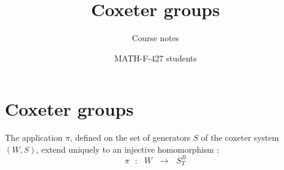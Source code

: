 \documentclass[envcountsame,envcountchap]{svmono}
\newcommand{\qq}{\text{ }}
\newcommand{\fctt}[2]{\qq:\qq#1\qq\rightarrow\qq#2}
\begin{document}
\author{MATH-F-427 students}
\title{Coxeter groups}
\subtitle{Course notes}
\maketitle

\frontmatter%

\tableofcontents


\mainmatter%
\part{Coxeter groups}



	\begin{theorem}\label{Theorem de l'extension en un morphisme injectif de groupe.}
		The application $\pi$, defined on the set of generators $S$ of the coxeter system $(W,S)$, extend uniquely to an injective homomorphism :
		\begin{equation}
		\pi\fctt{W}{S^B_T}
		\end{equation}
	\end{theorem}
\end{document}

